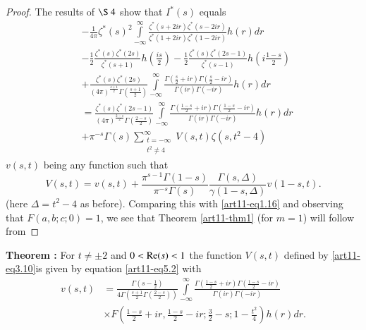 \begin{proof}
The results of $\S~4$ show that $I^\ast (s)$ equals 
\begin{align*}
& -\frac{1}{4\pi} \zeta^\ast (s)^2 \int\limits^\infty_{-\infty} \frac{\zeta^\ast (s+ 2 ir) \zeta^{\ast} (s -2 ir)}{\zeta^\ast (1+2 ir ) \zeta^\ast (1 - 2 ir)} h (r) dr\\ 
& - \frac{1}{2} \frac{\zeta^\ast (s) \zeta^\ast (2s)}{\zeta^\ast (s+1)} h \left(\frac{is}{2} \right) - \frac{1}{2} \frac{\zeta^\ast (s) \zeta^\ast (2s-1)}{\zeta^\ast (s-1)} h \left(i \frac{1-s}{2} \right)\\
& + \frac{\zeta^\ast (s) \zeta^\ast (2s)}{(4 \pi)^{\frac{s+1}{2}} \Gamma \left(\frac{s+1}{2} \right)} \int\limits^{\infty}_{-\infty} \frac{\Gamma \left(\frac{s}{2} + ir \right) \Gamma \left(\frac{s}{2} - ir \right)}{\Gamma (ir) \Gamma (-ir)} h (r) dr\\
& = \frac{\zeta^\ast (s) \zeta^\ast (2s -1)}{(4 \pi)^{\frac{2-s}{2}} \Gamma\left(\frac{2-s}{2} \right)} \int\limits^\infty_{-\infty} \frac{\Gamma \left(\frac{1-s}{2} + ir \right) \Gamma \left(\frac{1-s}{2} -ir \right)}{ \Gamma (ir) \Gamma (-ir)} h (r) dr \\
& + \pi^{-s} \Gamma (s) \sum\limits^\infty_{\substack{t = -\infty\\ t^2\neq 4}} V (s,t) \zeta (s, t^2 -4)
\end{align*}
$v(s,t)$ being any function such that 
\begin{equation*}
V(s,t) = v(s,t) + \frac{\pi^{s-1} \Gamma (1-s)}{\pi^{-s} \Gamma (s)} \frac{\Gamma (s, \Delta)}{\gamma (1-s, \Delta)} v (1-s,t). 
\tag{5.2}\label{art11-eq5.2}
\end{equation*}
(here $\Delta = t^2 -4$ as before). Comparing this with \eqref{art11-eq1.16} and observing that $F(a,b; c;0) =1$, we see that Theorem \ref{art11-thm1} (for $m=1$) will follow from
\end{proof}

\medskip
\noindent
{\bfseries Theorem :\label{art11-thm5}}
For $t \neq \pm 2$ and $0 < \operatorname{Re} (s) < 1$ the function $V(s,t)$ defined by \eqref{art11-eq3.10}\pageoriginale  is given by equation \eqref{art11-eq5.2} with 
\begin{align*}
v(s,t)& =\frac{\Gamma(s - \frac{1}{2})}{4 \Gamma \left(\frac{s+1}{2}  \Gamma \left(\frac{2-s}{2} \right)\right)} \int\limits^\infty_{-\infty} \frac{\Gamma \left(\frac{1-s}{2} + ir \right) \Gamma \left(\frac{1-s}{2} - ir \right)}{\Gamma (ir) \Gamma (-ir)}\\
& \times F \left(\frac{1-s}{2} + ir, \frac{1-s}{2} - ir; \frac{3}{2} -s ; 1 - \frac{t^2}{4} \right) h(r) dr. 
\end{align*} 

